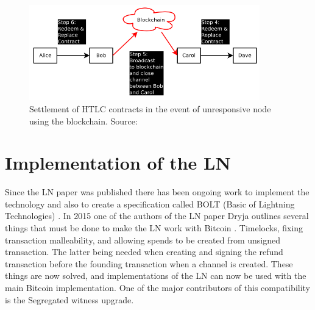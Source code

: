\documentclass[informationsecurity]{gucmasterproject}
\begin{document}
\begin{figure}[h]
    \centering
    \includegraphics[width=10cm]{figs/htlc_bc.png}
    \caption{ Settlement of HTLC contracts in the event of unresponsive node using the blockchain. Source: \cite{poon2015bitcoin}}
    \label{fig:htlc_bc}
\end{figure}


\chapter{Implementation of the LN}

Since the LN paper was published \cite{poon2015bitcoin} there has been ongoing work to implement the technology\cite{LN_imp1}\cite{LN_imp2}\cite{LN_imp3} and also to create a specification called BOLT (Basic of Lightning Technologies) \cite{LN_spec}. In 2015 one of the authors of the LN paper Dryja outlines several things that must be done to make the LN work with Bitcoin \cite{SB_bip}. Timelocks, fixing transaction malleability, and allowing spends to be created from unsigned transaction.
The latter being needed when creating and signing the refund transaction before the founding transaction when a channel is created.
These things are now solved, and implementations of the LN can now be used with the main Bitcoin implementation. One of the major contributors of this compatibility is the Segregated witness upgrade.
\end{document}
